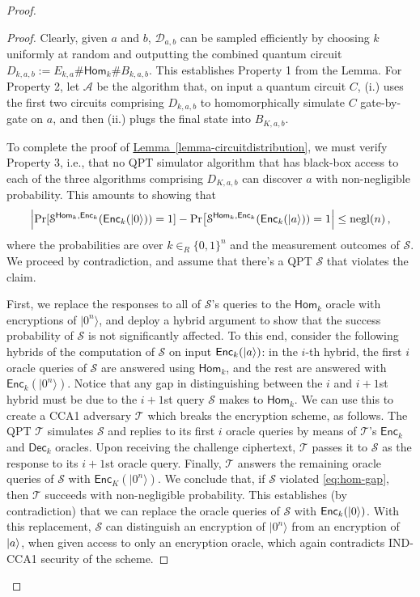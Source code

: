 \documentclass[11pt]{article}
\numberwithin{equation}{section}
\newcommand{\opn}{\operatorname}
\newcommand{\expref}[2]{\texorpdfstring{\hyperref[#2]{#1~\ref{#2}}}{#1~\ref{#2}}}
\newcommand{\algo}{\mathcal}
\newcommand{\negl}{\opn{negl}}
\newcommand{\Enc}{\ensuremath{\mathsf{Enc}}\xspace}
\newcommand{\Dec}{\ensuremath{\mathsf{Dec}}\xspace}
\newcommand{\Homorcl}{\ensuremath{\mathsf{Hom}}\xspace}
\newcommand{\inrand}{\in_R}
\begin{document}
{\begin{proof}
\begin{proof}
Clearly, given $a$ and $b$, $\mathcal{D}_{a,b}$ can be sampled efficiently by choosing $k$ uniformly at random and outputting the combined quantum circuit $D_{k, a, b} := E_{k,a}\#\Homorcl_{k}\#B_{k,a,b}$. This establishes Property 1 from the Lemma.  For Property 2, let $\algo{A}$ be the algorithm that, on input a quantum circuit $C$, (i.) uses the first two circuits comprising $D_{k,a,b}$ to homomorphically simulate $C$ gate-by-gate on $a$, and then (ii.) plugs the final state into $B_{K,a,b}$. 

To complete the proof of \expref{Lemma}{lemma-circuitdistribution}, we must verify Property 3, i.e., that no QPT simulator algorithm that has black-box access to  each of the three algorithms comprising $D_{K,a,b}$ can discover $a$ with non-negligible probability.  This amounts to showing that
\begin{equation}\label{eq:hom-gap}
\Bigl| \Pr[\mathcal S^{\Homorcl_k,\Enc_k}(\Enc_k(\ket{0})) = 1] 
- \Pr\bigl[\mathcal S^{\Homorcl_k,\Enc_k}(\Enc_k(\ket{a})) = 1 \Bigr| 
\leq \negl(n)\,,
\end{equation}
where the probabilities are over $k \inrand \{0,1\}^n$ and the measurement outcomes of $\algo{S}$. We proceed by contradiction, and assume that there's a QPT $\algo{S}$ that violates the claim. 

First, we replace the responses to all of $\algo{S}$'s queries to the $\Homorcl_k$ oracle with encryptions of $|0^n\rangle$, and deploy a hybrid argument to show that the success probability of $\algo S$ is not significantly affected. To this end, consider the following hybrids of the computation of $\algo S$ on input $\Enc_k(\ket{a})$: in the $i$-th hybrid, the first $i$ oracle queries of $\algo S$ are answered using $\Homorcl_k$, and the rest are answered with $\Enc_k(|0^n\rangle)$.  Notice that any gap in distinguishing between the $i$ and $i+1$st hybrid must be due to the $i+1$st query $\algo S$ makes to $\Homorcl_k$. We can use this to create a CCA1 adversary $\algo T$ which breaks the encryption scheme, as follows. The QPT $\algo T$ simulates $\algo S$ and replies to its first $i$ oracle queries by means of $\algo T$'s $\Enc_k$ and $\Dec_k$ oracles. Upon receiving the challenge ciphertext, $\algo T$ passes it to $\algo S$ as the response to its $i+1$st oracle query. Finally, $\algo T$ answers the remaining oracle queries of $\algo S$ with $\Enc_K(|0^n\rangle)$. We conclude that, if $\algo S$ violated \eqref{eq:hom-gap}, then $\algo T$ succeeds with non-negligible probability. This establishes (by contradiction) that we can replace the oracle queries of $\algo S$ with $\Enc_k(\ket 0)$. With this replacement, $\algo S$ can distinguish an encryption of $|0^n\rangle$ from an encryption of ${\left\vert{a}\right\rangle}$, when given access to only an encryption oracle, which again contradicts IND-CCA1 security of the scheme. 
\end{proof}


\end{proof}}
\end{document}
